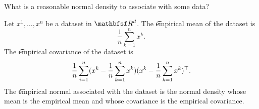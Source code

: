 
What is a reasonable normal density to associate with some data?


Let $x^1, \dots, x^n$ be a dataset in $\R^d$.
The \t{empirical mean} of the dataset is
$$
  \frac{1}{n} \sum_{k = 1}^{n} x^k.
$$
The \t{empirical covariance} of the dataset is
$$
  \frac{1}{n} \sum_{i = 1}^{n} (x^k - \frac{1}{n} \sum_{k = 1}^{n} x^k) (x^k - \frac{1}{n} \sum_{k = 1}^{n} x^k)^{\top}.
$$
The \t{empirical normal} associated with the dataset is the normal density whose mean is the empirical mean and whose covariance is the empirical covariance.
\strats
